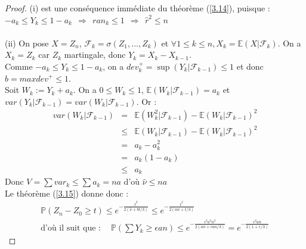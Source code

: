 \begin{proof}
(i) est une conséquence immédiate du théorème (\ref{3.14}), puisque :  $-a_k \leq Y_k \leq 1-a_k ~~\Rightarrow~~ ran_k \leq 1 ~~\Rightarrow~~ \hat r^2 \leq n$\\\\
(ii) On pose $X=Z_n$, $\mathcal{F}_k=\sigma(Z_1,...,Z_k)$ et $\forall 1 \leq k \leq n, X_k = \mathbb{E}(X|\mathcal{F}_k)$.
On a $X_k=Z_k$ car $Z_k$ martingale, donc $Y_k=X_k-X_{k-1}$.\\
Comme $-a_k \leq Y_k \leq 1-a_k$, on a $dev_k^+=\sup(Y_k|\mathcal{F}_{k-1}) \leq 1$ et donc $b=maxdev^+ \leq 1$. \\
Soit $W_k:=Y_k+a_k$. On a $0\leq W_k \leq 1$, $\mathbb{E}(W_k|\mathcal{F}_{k-1})=a_k$ et $var(Y_k|\mathcal{F}_{k-1})=var(W_k|\mathcal{F}_{k-1})$.
Or :\begin{eqnarray*}
var(W_k|\mathcal{F}_{k-1})&=&\mathbb{E}(W_k^2|\mathcal{F}_{k-1})-\mathbb{E}(W_k|\mathcal{F}_{k-1})^2\\ &\leq& \mathbb{E}(W_k|\mathcal{F}_{k-1})-\mathbb{E}(W_k|\mathcal{F}_{k-1})^2\\&=&a_k-a_k^2\\&=&a_k(1-a_k)\\ &\leq& a_k 
\end{eqnarray*}
Donc $V=\sum var_k \leq \sum a_k = na$
 d'où $\hat \nu \leq na$\\
Le théorème (\ref{3.15}) donne donc :
\begin{eqnarray*}
\mathbb{P}(Z_n-Z_0 \geq t) \leq e^{-\frac{t^2}{2(\hat \nu + bt/3)}} \leq e^{-\frac{t^2}{2(an+t/3)}}\\
\mbox{d'où il suit que :  }~~~~ \mathbb{P}(\sum Y_k \geq \epsilon an) \leq e^{-\frac{\epsilon^2a^2n^2}{2(an+\epsilon an/3)}}= e^{-\frac{\epsilon^2an}{2(1+\epsilon/3)}}
\end{eqnarray*}


\end{proof}
